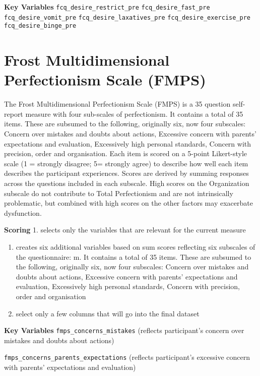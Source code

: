 \documentclass[
]{book}
\begin{document}
\textbf{Key Variables} \texttt{fcq\_desire\_restrict\_pre} \texttt{fcq\_desire\_fast\_pre}
\texttt{fcq\_desire\_vomit\_pre} \texttt{fcq\_desire\_laxatives\_pre}
\texttt{fcq\_desire\_exercise\_pre} \texttt{fcq\_desire\_binge\_pre}

\section{Frost Multidimensional Perfectionism Scale (FMPS)}\label{frost-multidimensional-perfectionism-scale-fmps}

The Frost Multidimensional Perfectionism Scale (FMPS) is a 35 question
self-report measure with four sub-scales of perfectionism. It contains a
total of 35 items. These are subsumed to the following, originally six,
now four subscales: Concern over mistakes and doubts about actions,
Excessive concern with parents' expectations and evaluation, Excessively
high personal standards, Concern with precision, order and organisation.
Each item is scored on a 5-point Likert-style scale (1 = strongly
disagree; 5= strongly agree) to describe how well each item describes
the participant experiences. Scores are derived by summing responses
across the questions included in each subscale. High scores on the
Organization subscale do not contribute to Total Perfectionism and are
not intrinsically problematic, but combined with high scores on the
other factors may exacerbate dysfunction.

\textbf{Scoring} 1. selects only the variables that are relevant for the
current measure

\begin{enumerate}
\def\labelenumi{\arabic{enumi}.}
\setcounter{enumi}{1}
\item
  creates six additional variables based on sum scores reflecting six
  subscales of the questionnaire: m. It contains a total of 35 items.
  These are subsumed to the following, originally six, now four
  subscales: Concern over mistakes and doubts about actions, Excessive
  concern with parents' expectations and evaluation, Excessively high
  personal standards, Concern with precision, order and organisation
\item
  select only a few columns that will go into the final dataset
\end{enumerate}

\textbf{Key Variables} \texttt{fmps\_concerns\_mistakes} (reflects participant's
concern over mistakes and doubts about actions)

\texttt{fmps\_concerns\_parents\_expectations} (reflects participant's excessive
concern with parents' expectations and evaluation)
\end{document}
